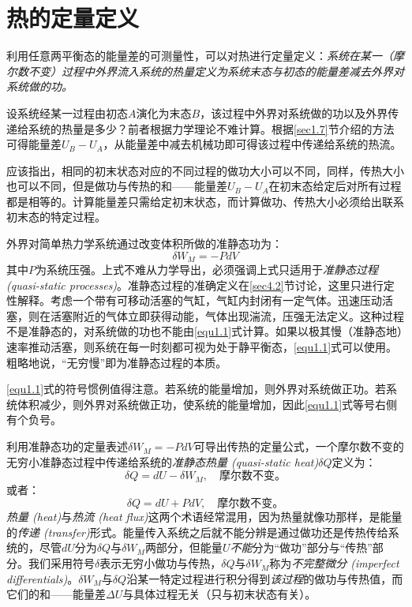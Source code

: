 \section{热的定量定义}
\label{sec1.8}
利用任意两平衡态的能量差的可测量性，可以对热进行定量定义：{\it 系统在某一（摩尔数不变）过程中外界流入系统的热量定义为系统末态与初态的能量差减去外界对系统做的功。}

设系统经某一过程由初态$A$演化为末态$B$，该过程中外界对系统做的功以及外界传递给系统的热量是多少？前者根据力学理论不难计算。根据\ref{sec1.7}节介绍的方法可得能量差$U_B - U_A$，从能量差中减去机械功即可得该过程中传递给系统的热流。

应该指出，相同的初末状态对应的不同过程的做功大小可以不同，同样，传热大小也可以不同，但是做功与传热的和——能量差$U_B - U_A$在初末态给定后对所有过程都是相等的。计算能量差只需给定初末状态，而计算做功、传热大小必须给出联系初末态的特定过程。

外界对简单热力学系统通过改变体积所做的准静态功为：
\begin{equation}
\label{equ1.1}
	\delta W_M = -P dV
\end{equation}
其中$P$为系统压强。上式不难从力学导出，必须强调上式只适用于{\it 准静态过程 (quasi-static processes)}。准静态过程的准确定义在\ref{sec4.2}节讨论，这里只进行定性解释。考虑一个带有可移动活塞的气缸，气缸内封闭有一定气体。迅速压动活塞，则在活塞附近的气体立即获得动能，气体出现湍流，压强无法定义。这种过程不是准静态的，对系统做的功也不能由\eqref{equ1.1}式计算。如果以极其慢（准静态地）速率推动活塞，则系统在每一时刻都可视为处于静平衡态，\eqref{equ1.1}式可以使用。粗略地说，“无穷慢”即为准静态过程的本质。

\eqref{equ1.1}式的符号惯例值得注意。若系统的能量增加，则外界对系统做正功。若系统体积减少，则外界对系统做正功，使系统的能量增加，因此\eqref{equ1.1}式等号右侧有个负号。

利用准静态功的定量表述$\delta W_M = -PdV$可导出传热的定量公式，一个摩尔数不变的无穷小准静态过程中传递给系统的{\it 准静态热量 (quasi-static heat)}$\delta Q$定义为：
\begin{equation}
\label{equ1.2}
	\delta Q = dU - \delta W_M, \quad \text{摩尔数不变。}
\end{equation}
或者：
\begin{equation}
\label{equ1.3}
	\delta Q = dU + P dV, \quad \text{摩尔数不变。}
\end{equation}
{\it 热量 (heat)}与{\it 热流 (heat flux)}这两个术语经常混用，因为热量就像功那样，是能量的{\it 传递 (transfer)}形式。能量传入系统之后就不能分辨是通过做功还是传热传给系统的，尽管$dU$分为$\delta Q$与$\delta W_M$两部分，但能量$U${\it 不能}分为“做功”部分与“传热”部分。我们采用符号$\delta$表示无穷小做功与传热，$\delta Q$与$\delta W_M$称为{\it 不完整微分 (imperfect differentials)}。$\delta W_M$与$\delta Q$沿某一特定过程进行积分得到{\it 该过程}的做功与传热值，而它们的和——能量差$\Delta U$与具体过程无关（只与初末状态有关）。


